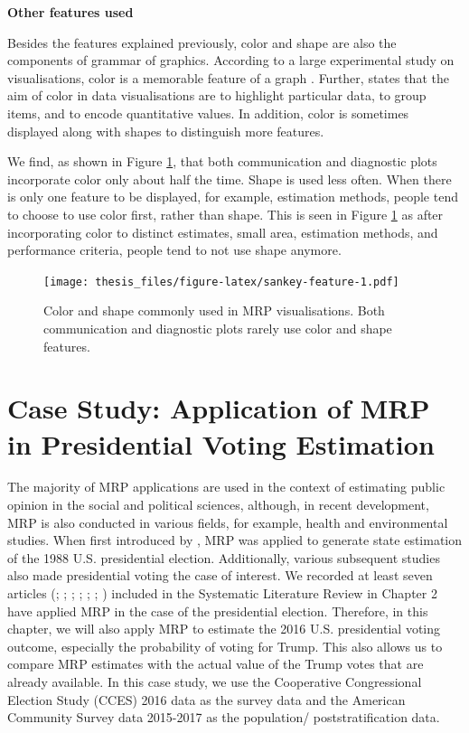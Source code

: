 \documentclass{monashthesis}
\begin{document}
\newpage

\textbf{Other features used}

Besides the features explained previously, color and shape are also the components of grammar of graphics. According to a large experimental study on visualisations, color is a memorable feature of a graph \autocite{MIDWAY2020100141}. Further, \textcite{few_2008} states that the aim of color in data visualisations are to highlight particular data, to group items, and to encode quantitative values. In addition, color is sometimes displayed along with shapes to distinguish more features.

We find, as shown in Figure \ref{fig:sankey-feature}, that both communication and diagnostic plots incorporate color only about half the time. Shape is used less often. When there is only one feature to be displayed, for example, estimation methods, people tend to choose to use color first, rather than shape. This is seen in Figure \ref{fig:sankey-feature} as after incorporating color to distinct estimates, small area, estimation methods, and performance criteria, people tend to not use shape anymore.

\begin{figure}
\centering
\texttt{[image: thesis\_files/figure-latex/sankey-feature-1.pdf]}
\caption{\label{fig:sankey-feature}Color and shape commonly used in MRP visualisations. Both communication and diagnostic plots rarely use color and shape features.}
\end{figure}

\hypertarget{ch:case-stud}{%
\chapter{Case Study: Application of MRP in Presidential Voting Estimation}\label{ch:case-stud}}

The majority of MRP applications are used in the context of estimating public opinion in the social and political sciences, although, in recent development, MRP is also conducted in various fields, for example, health and environmental studies. When first introduced by \textcite{Gelman97poststratificationinto}, MRP was applied to generate state estimation of the 1988 U.S. presidential election. Additionally, various subsequent studies also made presidential voting the case of interest. We recorded at least seven articles (\textcite{GelmanAndrew2014HBAC}; \textcite{GhitzaYair2013DIwM}; \textcite{KiewietdeJongeChadP2018PSPE}; \textcite{LauderdaleBenjaminE2020Mppf}; \textcite{LeiRayleigh2017T2EA}; \textcite{ParkDavidK2004BMEw}; \textcite{WangWei2015Fewn}) included in the Systematic Literature Review in Chapter 2 have applied MRP in the case of the presidential election. Therefore, in this chapter, we will also apply MRP to estimate the 2016 U.S. presidential voting outcome, especially the probability of voting for Trump. This also allows us to compare MRP estimates with the actual value of the Trump votes that are already available. In this case study, we use the Cooperative Congressional Election Study (CCES) 2016 data \autocite{cces_data} as the survey data and the American Community Survey data 2015-2017 \autocite{acs_data} as the population/ poststratification data.
\end{document}

